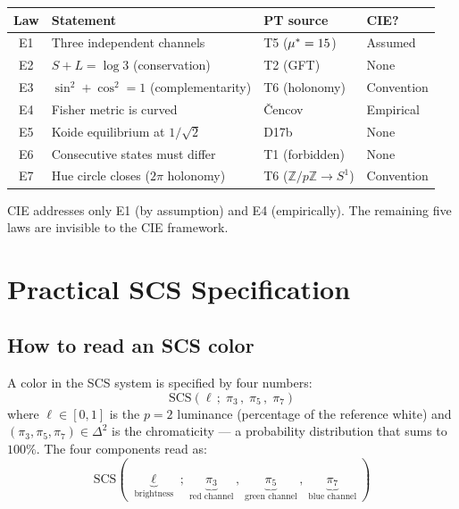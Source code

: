 \documentclass[12pt,a4paper]{article}
\begin{document}
\begin{center}
\begin{tabular}{clll}
\toprule
\textbf{Law} & \textbf{Statement} & \textbf{PT source} & \textbf{CIE?} \\
\midrule
E1 & Three independent channels & T5 (${\mu^{*}} = 15$) & Assumed \\
E2 & $S + L = \log 3$ (conservation) & T2 (GFT) & None \\
E3 & $\sin^2 + \cos^2 = 1$ (complementarity) & T6 (holonomy) & Convention \\
E4 & Fisher metric is curved & \v{C}encov & Empirical \\
E5 & Koide equilibrium at $1/\sqrt{2}$ & D17b & None \\
E6 & Consecutive states must differ & T1 (forbidden) & None \\
E7 & Hue circle closes ($2\pi$ holonomy) & T6 ($\mathbb{Z}/p\mathbb{Z} \to S^1$) & Convention \\
\bottomrule
\end{tabular}
\end{center}

CIE addresses only E1 (by assumption) and E4 (empirically). The
remaining five laws are invisible to the CIE framework.

\section{Practical SCS Specification}
\label{sec:practical}

\subsection{How to read an SCS color}

A color in the SCS system is specified by four numbers:
\begin{equation}
  \mathrm{SCS}(\ell\,;\; \pi_3\,,\; \pi_5\,,\; \pi_7)
\end{equation}
where $\ell \in [0,1]$ is the $p=2$ luminance (percentage of the
reference white) and $(\pi_3, \pi_5, \pi_7) \in \Delta^2$ is the
chromaticity --- a probability distribution that sums to $100\%$.
The four components read as:
\[
  \mathrm{SCS}(\;\underbrace{\ell}_{\text{brightness}}\;;\;
  \underbrace{\pi_3}_{\text{red channel}}\,,\;
  \underbrace{\pi_5}_{\text{green channel}}\,,\;
  \underbrace{\pi_7}_{\text{blue channel}}\;)
\]
\end{document}
